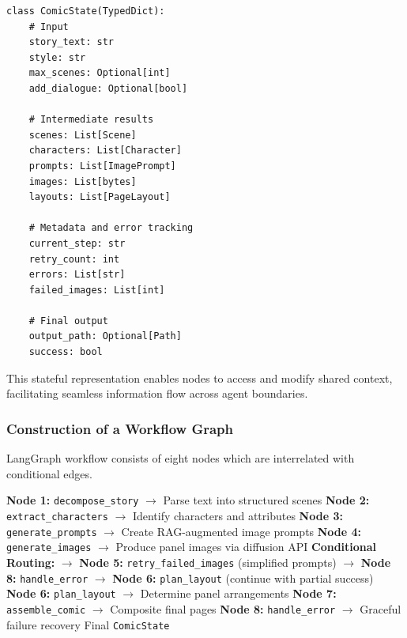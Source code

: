 \documentclass[runningheads]{llncs}
\begin{document}
\begin{small}
\begin{verbatim}
class ComicState(TypedDict):
    # Input
    story_text: str
    style: str
    max_scenes: Optional[int]
    add_dialogue: Optional[bool]

    # Intermediate results
    scenes: List[Scene]
    characters: List[Character]
    prompts: List[ImagePrompt]
    images: List[bytes]
    layouts: List[PageLayout]

    # Metadata and error tracking
    current_step: str
    retry_count: int
    errors: List[str]
    failed_images: List[int]

    # Final output
    output_path: Optional[Path]
    success: bool
\end{verbatim}
\end{small}

This stateful representation enables nodes to access and modify shared context, facilitating seamless information flow across agent boundaries.

\subsubsection{Construction of a Workflow Graph}

LangGraph workflow consists of eight nodes which are interrelated with conditional edges.

\begin{algorithm}
\caption{ComicCrafter LangGraph Workflow}
\begin{algorithmic}[1]
\STATE \textbf{Node 1:} \texttt{decompose\_story} $\rightarrow$ Parse text into structured scenes
\STATE \textbf{Node 2:} \texttt{extract\_characters} $\rightarrow$ Identify characters and attributes
\STATE \textbf{Node 3:} \texttt{generate\_prompts} $\rightarrow$ Create RAG-augmented image prompts
\STATE \textbf{Node 4:} \texttt{generate\_images} $\rightarrow$ Produce panel images via diffusion API
\STATE \textbf{Conditional Routing:}
    \STATE $\rightarrow$ \textbf{Node 5:} \texttt{retry\_failed\_images} (simplified prompts)
    \STATE $\rightarrow$ \textbf{Node 8:} \texttt{handle\_error}
\ELSE
    \STATE $\rightarrow$ \textbf{Node 6:} \texttt{plan\_layout} (continue with partial success)
\ENDIF
\STATE \textbf{Node 6:} \texttt{plan\_layout} $\rightarrow$ Determine panel arrangements
\STATE \textbf{Node 7:} \texttt{assemble\_comic} $\rightarrow$ Composite final pages
\STATE \textbf{Node 8:} \texttt{handle\_error} $\rightarrow$ Graceful failure recovery
\RETURN Final \texttt{ComicState}
\end{algorithmic}
\end{algorithm}
\end{document}
